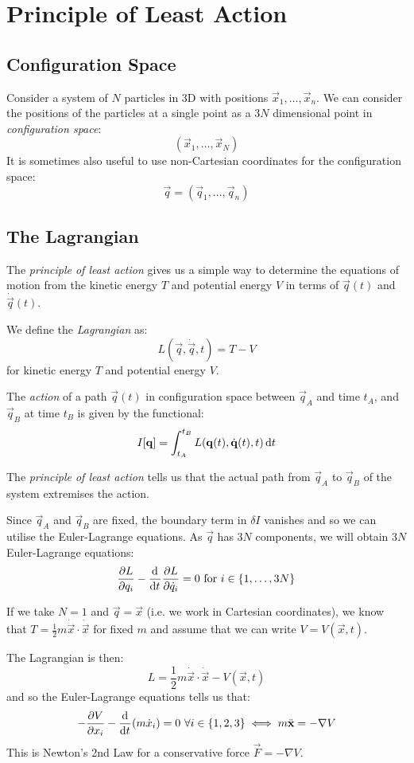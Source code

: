 \documentclass[../main.tex]{subfiles}
\begin{document}
\chapter{Principle of Least Action}
\section{Configuration Space}
Consider a system of $N$ particles in 3D with positions $\vec{x}_1, \ldots, \vec{x}_n$.
We can consider the positions of the particles at a single point as a $3N$ dimensional point in \textit{configuration space}:
\[
  (\vec{x}_1, \ldots, \vec{x}_N)
\]
It is sometimes also useful to use non-Cartesian coordinates for the configuration space:
\[
  \vec{q} = (\vec{q}_1, \ldots, \vec{q}_n)
\]
\section{The Lagrangian}
The \textit{principle of least action} gives us a simple way to determine the equations of motion from the kinetic energy $T$ and potential energy $V$ in terms of $\vec{q}(t)$ and $\dot{\vec{q}}(t)$.
\begin{definition}[Lagrangian]
  We define the \textit{Lagrangian} as:
  \[
    L(\vec{q}, \dot{\vec{q}}, t) = T - V
  \]
  for kinetic energy $T$ and potential energy $V$.
\end{definition}
\begin{definition}[Action]
  The \textit{action} of a path $\vec{q}(t)$ in configuration space between $\vec{q}_A$ and time $t_A$, and $\vec{q}_B$ at time $t_B$ is given by the functional: \label{actionDef}
  \[
    I[\vec{q}] = \int_{t_A}^{t_B} L(\vec{q}(t), \dot{\vec{q}}(t), t) \d{t}
  \]
\end{definition}
\begin{law}
  The \textit{principle of least action} tells us that the actual path from $\vec{q}_A$ to $\vec{q}_B$ of the system extremises the action. \label{principleLeastAction}
\end{law}
Since $\vec{q}_A$ and $\vec{q}_B$ are fixed, the boundary term in $\delta I$ vanishes and so we can utilise the Euler-Lagrange equations.
As $\vec{q}$ has $3N$ components, we will obtain $3N$ Euler-Lagrange equations:
\[
  \pderiv{L}{q_i} - \deriv{}{t} \pderiv{L}{\dot{q}_i} = 0 \text{ for } i \in \{1, \ldots, 3N\}
\]
\begin{example}
  If we take $N = 1$ and $\vec{q} = \vec{x}$ (i.e. we work in Cartesian coordinates), we know that $T = \frac{1}{2} m \dot{\vec{x}} \cdot \dot{\vec{x}}$ for fixed $m$ and assume that we can write $V = V(\vec{x}, t)$. \label{n1LG}

  The Lagrangian is then:
  \[
    L = \frac{1}{2} m \dot{\vec{x}} \cdot \dot{\vec{x}} - V(\vec{x}, t)
  \]
  and so the Euler-Lagrange equations tells us that:
  \[
    -\pderiv{V}{x_i} - \deriv{}{t}(m \dot{x}_i) = 0 \ \forall i \in \{1, 2, 3\} \iff m \ddot{\vec{x}} = -\nabla V
  \]
  This is Newton's 2nd Law for a conservative force $\vec{F} = - \nabla V$.
\end{example}
\end{document}
